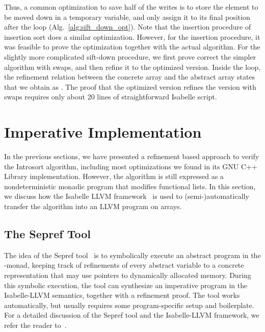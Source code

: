 \documentclass[sigplan,10pt,anonymous,review]{acmart}\settopmatter{printfolios=true,printccs=false,printacmref=false}
\theoremstyle{definition}
\begin{document}
  Thus, a common optimization to save half of the writes is to store the element to be moved down in a temporary variable, and only
  assign it to its final position after the loop (Alg.~\ref{alg:sift_down_opt}). Note that the insertion procedure of insertion sort does a similar optimization.
  However, for the insertion procedure, it was feasible to prove the optimization together with the actual algorithm.
  For the slightly more complicated sift-down procedure, we first prove correct the simpler algorithm with swaps,
  and then refine it to the optimized version. Inside the loop, the refinement relation between the concrete array  and the
  abstract array  states that
  we obtain  as . The proof that the optimized version refines the version with swaps requires only about 20
  lines of straightforward Isabelle script.


\section{Imperative Implementation}
  In the previous sections, we have presented a refinement based approach to verify the Introsort algorithm,
  including most optimizations we found in its GNU C++ Library implementation. However, the algorithm is still expressed
  as a nondeterministic monadic program that modifies functional lists. In this section, we discuss how the Isabelle LLVM framework~\cite{La19-llvm} is
  used to (semi-)automatically transfer the algorithm into an LLVM program on arrays.

  \subsection{The Sepref Tool}
  The idea of the Sepref tool~\cite{La15,La19-llvm} is to symbolically execute an abstract program in the -monad,
  keeping track of refinements of every abstract variable to a concrete representation that may use pointers to dynamically allocated memory.
  During this symbolic execution, the tool can synthesize an imperative program in the Isabelle-LLVM semantics, together with a refinement proof.
  The tool works automatically, but usually requires some program-specific setup and boilerplate. For a detailed discussion of the Sepref tool and the Isabelle-LLVM framework, we refer the reader to~\cite{La15,La19-llvm}.
\end{document}
